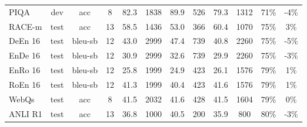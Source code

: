 \documentclass{article}
\begin{document}
\begin{table}
{\begin{adjustwidth}{-1.4in}{-1.4in}
\begin{center}
\begin{tabular}{lccccccccccc}
                PIQA &   dev &      acc &   8 &        82.3 &                      1838 &                            89.9 &                       526 &                            79.3 &                      1312 &                            71\% &                                                -4\% \\
              RACE-m &  test &      acc &  13 &        58.5 &                      1436 &                            53.0 &                       366 &                            60.4 &                      1070 &                            75\% &                                                 3\% \\
        DeEn 16 &  test &  bleu-sb &  12 &        43.0 &                      2999 &                            47.4 &                       739 &                            40.8 &                      2260 &                            75\% &                                                -5\% \\
        EnDe 16 &  test &  bleu-sb &  12 &        30.9 &                      2999 &                            32.6 &                       739 &                            29.9 &                      2260 &                            75\% &                                                -3\% \\
        EnRo 16 &  test &  bleu-sb &  12 &        25.8 &                      1999 &                            24.9 &                       423 &                            26.1 &                      1576 &                            79\% &                                                 1\% \\
        RoEn 16 &  test &  bleu-sb &  12 &        41.3 &                      1999 &                            40.4 &                       423 &                            41.6 &                      1576 &                            79\% &                                                 1\% \\
               WebQs &  test &      acc &   8 &        41.5 &                      2032 &                            41.6 &                       428 &                            41.5 &                      1604 &                            79\% &                                                 0\% \\
             ANLI R1 &  test &      acc &  13 &        36.8 &                      1000 &                            40.5 &                       200 &                            35.9 &                       800 &                            80\% &                                                -3\% \\

\end{tabular}
\end{center}
\end{adjustwidth}}
\end{table}
\end{document}
